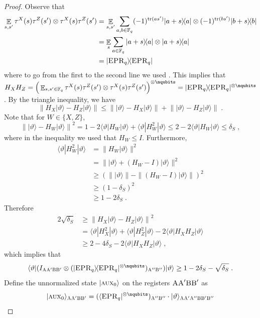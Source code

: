 \documentclass[11pt]{article}
\theoremstyle{definition}
\newcommand{\ket}[1]{|#1\rangle}
\newcommand{\bra}[1]{\langle#1|}
\newcommand{\ketbra}[2]{\ket{#1}\!\bra{#2}}
\newcommand{\proj}[1]{\ket{#1}\!\bra{#1}}
\newcommand{\Id}{\ensuremath{I}}
\newcommand{\F}{\ensuremath{\mathbb{F}}}
\DeclareMathOperator{\tr}{tr}
\newcommand{\E}{\mathop{\mathbb{E}}\displaylimits}
\newcommand{\labelstyle}[1]{\ensuremath{\textsc{#1}}\xspace}
\newcommand{\EPR}{\labelstyle{EPR}}
\newcommand{\aux}{\labelstyle{aux}}
\newcommand{\alice}{\labelstyle{A}}
\newcommand{\bob}{\labelstyle{B}}
\begin{document}
\begin{proof}
Observe that
\begin{align*}
	\E_{s,s'} \tau^X(s) \tau^Z(s') \otimes \tau^X(s) \tau^Z(s') &= \E_{s,s'} \sum_{a,b \in \F_q} (-1)^{\tr(as')} \ketbra{a+s}{a} \otimes (-1)^{\tr(bs')} \ketbra{b+s}{b} \\
	&= \E_{s} \sum_{a\in \F_q} \ketbra{a+s}{a} \otimes \ketbra{a+s}{a} \\
	&= \proj{\EPR_q}
\end{align*}
where to go from the first to the second line we used . This implies that $H_X H_Z = \Big ( \E_{s,s' \in \F_q} \tau^X(s)\tau^Z(s') \otimes \tau^X(s)\tau^Z(s') \Big)^{\otimes \nqubits} = \ketbra{\EPR_q}{\EPR_q}^{\otimes \nqubits}$.
By the triangle inequality, we have
\[
	\left \| H_X \ket{\vartheta} - H_Z \ket{\vartheta} \right\| \leq \left \| \ket{\vartheta} - H_X \ket{\vartheta} \right\| + \left \| \ket{\vartheta} - H_Z \ket{\vartheta} \right\|\;.
\]
Note that for $W \in \{X,Z\}$,
\[
	\left \| \ket{\vartheta} - H_W \ket{\vartheta} \right\|^2 = 1 - 2\bra{\vartheta} H_W \ket{\vartheta} + \bra{\vartheta} H_W^2 \ket{\vartheta} \leq 2 - 2\bra{\vartheta} H_W \ket{\vartheta} \leq \delta_S\;,
\]
where in the inequality we used that $H_W \leq \Id$. Furthermore,
\begin{align*}
	\bra{\vartheta} H_W^2 \ket{\vartheta} &=\| H_W \ket{\vartheta} \|^2\\
	 &= \| \ket{\vartheta} + (H_W - \Id) \ket{\vartheta} \|^2 \\
	 &\geq (\|\ket{\vartheta}\| - \| (H_W - \Id) \ket{\vartheta} \|)^2 \\
	 &\geq (1 - \delta_S)^2 \\
	 &\geq 1 - 2\delta_S\;. 
\end{align*}
Therefore 
\begin{align*}
2\sqrt{\delta_S} &\geq \left \| H_X \ket{\vartheta} - H_Z \ket{\vartheta} \right\|^2  \\
&= \bra{\vartheta} H_X^2 \ket{\vartheta} + \bra{\vartheta} H_Z^2 \ket{\vartheta} - 2\bra{\vartheta} H_X H_Z \ket{\vartheta} \\
&\geq 2 - 4\delta_S - 2\bra{\vartheta} H_X H_Z \ket{\vartheta} \;,
\end{align*}
which implies that 
\[
	\bra{\vartheta} (\Id_{\alice \alice' \bob \bob'} \otimes (\proj{\EPR_q}^{\otimes \nqubits})_{\alice'' \bob''}) \ket{\vartheta} \geq 1 - 2\delta_S - \sqrt{\delta_S} \;.
\]
Define the unnormalized state $\ket{\aux_0}$ on the registers $\alice \alice' \bob \bob'$ as
\[
	\ket{\aux_0}_{\alice \alice' \bob \bob'} = (\bra{\EPR_q}^{\otimes \nqubits})_{\alice'' \bob''} \cdot \ket{\vartheta}_{\alice \alice' \alice'' \bob \bob' \bob''}
\]
\end{proof}
\end{document}
